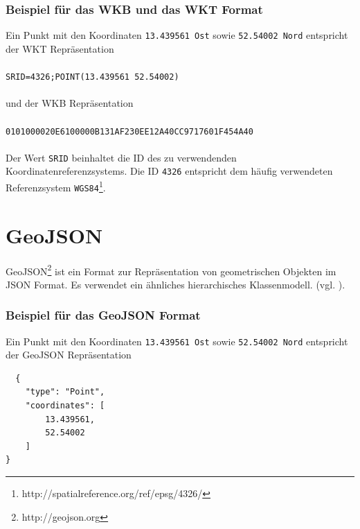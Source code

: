 \subsubsection{Beispiel für das WKB und das WKT Format}
Ein Punkt mit den Koordinaten \texttt{13.439561 Ost} sowie \texttt{52.54002 Nord} entspricht der WKT Repräsentation\\\\
\texttt{SRID=4326;POINT(13.439561 52.54002)}\\\\
und der WKB Repräsentation\\\\
\texttt{0101000020E6100000B131AF230EE12A40CC9717601F454A40}\\\\
Der Wert \texttt{SRID} beinhaltet die ID des zu verwendenden Koordinatenreferenzsystems.
Die ID \texttt{4326} entspricht dem häufig verwendeten Referenzsystem \texttt{WGS84}\footnote{http://spatialreference.org/ref/epsg/4326/}.  

\section{GeoJSON}
\label{sec:appendix:geojson}
GeoJSON\footnote{http://geojson.org} ist ein Format zur Repräsentation von geometrischen Objekten im JSON Format.
Es verwendet ein ähnliches hierarchisches Klassenmodell. (vgl. \cite{WEB:GEOJSON:Spec:2008}).

\subsubsection{Beispiel für das GeoJSON Format}
Ein Punkt mit den Koordinaten \texttt{13.439561 Ost} sowie \texttt{52.54002 Nord} entspricht der GeoJSON Repräsentation
\lstset{
  numbers=none,
  caption=Beispiel eines geometrischen Punktes in GeoJSON Repräsentation,
  label=
}
\begin{lstlisting}
  {
    "type": "Point",
    "coordinates": [
        13.439561,
        52.54002
    ]
}
\end{lstlisting}


